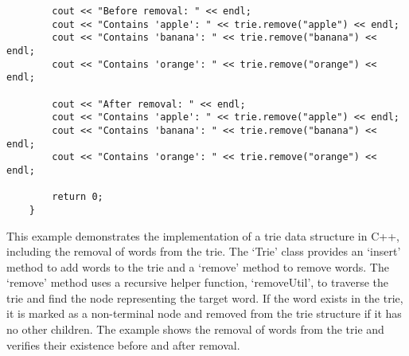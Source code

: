 \begin{solution}
\begin{verbatim}
        cout << "Before removal: " << endl;
        cout << "Contains 'apple': " << trie.remove("apple") << endl;
        cout << "Contains 'banana': " << trie.remove("banana") << endl;
        cout << "Contains 'orange': " << trie.remove("orange") << endl;
    
        cout << "After removal: " << endl;
        cout << "Contains 'apple': " << trie.remove("apple") << endl;
        cout << "Contains 'banana': " << trie.remove("banana") << endl;
        cout << "Contains 'orange': " << trie.remove("orange") << endl;
    
        return 0;
    }
    \end{verbatim}

    \horizontalline

    This example demonstrates the implementation of a trie data structure in C++, including the removal of words from the trie. The `Trie' class provides an `insert' method to add words to the trie and a `remove' method to remove words. The `remove' method uses a recursive helper function, `removeUtil', to traverse the trie and find the node 
    representing the target word. If the word exists in the trie, it is marked as a non-terminal node and removed from the trie structure if it has no other children. The example shows the removal of words from the trie and verifies their existence before and after removal.
\end{solution}
